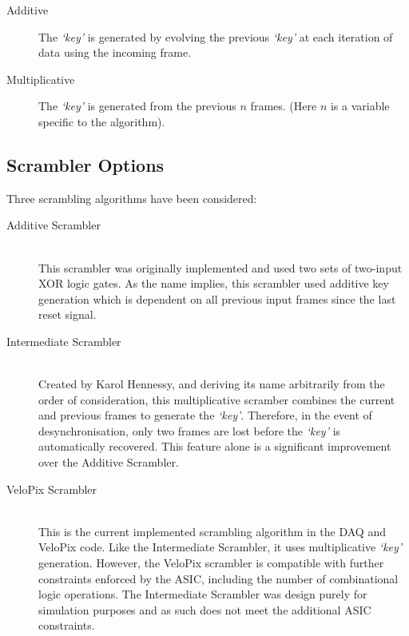 	\begin{description}
		\item[Additive] The \textit{`key'} is generated by evolving the previous \textit{`key'} at each iteration of data using the incoming frame.
		\item[Multiplicative] The  \textit{`key'} is generated from the previous $n$ frames. (Here $n$ is a variable specific to the algorithm).
	\end{description}

	\subsection{Scrambler Options}
	\label{sub:scrambler_options}

		Three scrambling algorithms have been considered:

		\begin{description}
			\item[Additive Scrambler] \hfill \\
				This scrambler was originally implemented and used two sets of two-input XOR logic gates.
				As the name implies, this scrambler used additive key generation which is dependent on all previous input frames since the last reset signal.

			\item[Intermediate Scrambler] \hfill \\
				Created by Karol Hennessy, and deriving its name arbitrarily from the order of consideration, this multiplicative scramber combines the current and previous frames to generate the \textit{`key'}.
				Therefore, in the event of desynchronisation, only two frames are lost before the \textit{`key'} is automatically recovered.
				This feature alone is a significant improvement over the Additive Scrambler.

			\item[VeloPix Scrambler] \hfill \\
				This is the current implemented scrambling algorithm in the DAQ and VeloPix code.
				Like the Intermediate Scrambler, it uses multiplicative \textit{`key'} generation.
				However, the VeloPix scrambler is compatible with further constraints enforced by the ASIC, including the number of combinational logic operations.
				The Intermediate Scrambler was design purely for simulation purposes and as such does not meet the additional ASIC constraints.
		\end{description}


